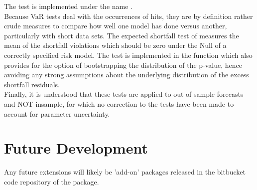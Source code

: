 The test is implemented under the name \verb@VaRDurTest@.\\
Because VaR tests deal with the occurrences of hits, they are by definition
rather crude measures to compare how well one model has done versus another,
particularly with short data sets. The expected shortfall test of \cite{McNeil2000}
measures the mean of the shortfall violations which should be zero under the Null of a
correctly specified risk model. The test is implemented in the function \verb@ESTest@
which also provides for the option of bootstrapping the distribution of the p-value,
hence avoiding any strong assumptions about the underlying distribution of the excess
shortfall residuals.\\
Finally, it is understood that these tests are applied to out-of-sample forecasts
and NOT insample, for which no correction to the tests have been made to account
for parameter uncertainty.


\section{Future Development}\label{section:fut}
Any future extensions will likely be 'add-on' packages released in the bitbucket
code repository of the package.

